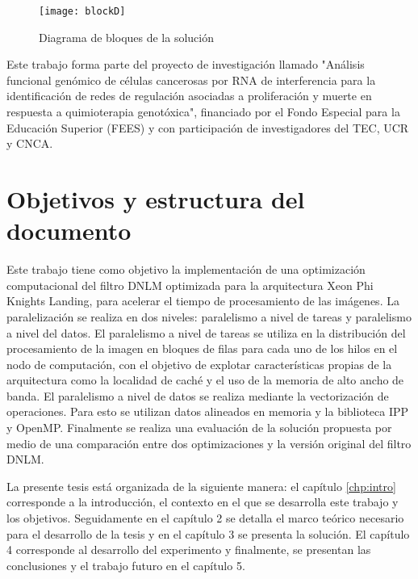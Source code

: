 \begin{figure}[H]
  \centering
  \texttt{[image: blockD]}
  \caption{Diagrama de bloques de la soluci\'on}
  \label{fig:diagram1}
\end{figure}

Este trabajo forma parte del proyecto de investigaci\'on llamado "Análisis funcional genómico de células cancerosas por RNA de interferencia para la identificación de redes de regulación asociadas a proliferación y muerte en respuesta a quimioterapia genotóxica", financiado por el Fondo Especial para la Educaci\'on Superior (FEES) y con participaci\'on de investigadores del TEC, UCR y CNCA. 


\section{Objetivos y estructura del documento}


Este trabajo tiene como objetivo la implementaci\'on de una optimizaci\'on computacional del filtro DNLM optimizada para la arquitectura Xeon Phi Knights Landing, para acelerar el tiempo de procesamiento de las im\'agenes. La paralelizaci\'on se realiza en dos niveles: paralelismo a nivel de tareas y paralelismo a nivel del datos. El paralelismo a nivel de tareas se utiliza en la distribuci\'on del procesamiento de la imagen en bloques de filas para cada uno de los hilos en el nodo de computaci\'on, con el objetivo de explotar caracter\'isticas propias de la arquitectura como la localidad de cach\'e y el uso de la memoria de alto ancho de banda. El paralelismo a nivel de datos se realiza mediante la vectorizaci\'on de operaciones. Para esto se utilizan datos alineados en memoria y la biblioteca IPP y OpenMP. Finalmente se realiza una evaluaci\'on de la soluci\'on propuesta por medio de una comparaci\'on entre dos optimizaciones y la versi\'on original del filtro DNLM.


La presente tesis est\'a organizada de la siguiente manera: el cap\'itulo \ref{chp:intro} corresponde a la introducci\'on, el contexto en el que se desarrolla este trabajo y los objetivos. Seguidamente en el cap\'itulo 2 se detalla el marco te\'orico necesario para el desarrollo de la tesis y en el cap\'itulo 3 se presenta la soluci\'on. El cap\'itulo 4 corresponde al desarrollo del experimento y finalmente, se presentan las conclusiones y el trabajo futuro en el cap\'itulo 5. 


%

